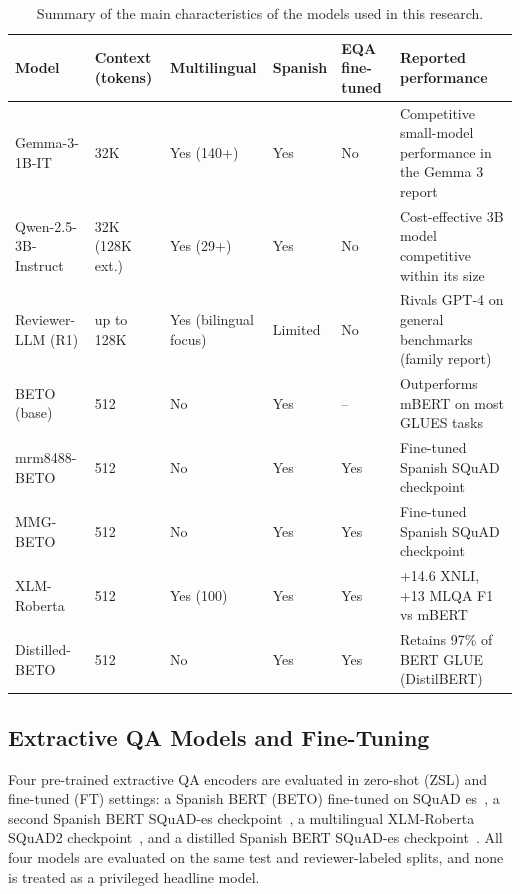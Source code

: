 \documentclass[graybox]{SNmult}
\begin{document}
\begin{table}[!t]
\caption{Summary of the main characteristics of the models used in this research.}
\label{tab:model-summary}
\centering
\small
\begin{tabular}{p{2.8cm}p{1.5cm}p{1.4cm}p{1.2cm}p{1.5cm}p{3.0cm}}
\toprule
Model & Context (tokens) & Multilingual & Spanish & EQA fine-tuned & Reported performance \\
\midrule
Gemma-3-1B-IT & 32K & Yes (140+) & Yes & No & Competitive small-model performance in the Gemma 3 report \\
Qwen-2.5-3B-Instruct & 32K (128K ext.) & Yes (29+) & Yes & No & Cost-effective 3B model competitive within its size \\
Reviewer-LLM (R1) & up to 128K & Yes (bilingual focus) & Limited & No & Rivals GPT-4 on general benchmarks (family report) \\
BETO (base) & 512 & No & Yes & -- & Outperforms mBERT on most GLUES tasks \\
mrm8488-BETO & 512 & No & Yes & Yes & Fine-tuned Spanish SQuAD checkpoint \\
MMG-BETO & 512 & No & Yes & Yes & Fine-tuned Spanish SQuAD checkpoint \\
XLM-Roberta & 512 & Yes (100) & Yes & Yes & +14.6 XNLI, +13 MLQA F1 vs mBERT \\
Distilled-BETO & 512 & No & Yes & Yes & Retains 97\% of BERT GLUE (DistilBERT) \\
\bottomrule
\end{tabular}
\end{table}


\subsection{Extractive QA Models and Fine-Tuning}

Four pre-trained extractive QA encoders are evaluated in zero-shot (ZSL) and
fine-tuned (FT) settings: a Spanish BERT (BETO) fine-tuned on SQuAD
es~\cite{mrm8488_beto_squad2_hf}, a second Spanish BERT SQuAD-es
checkpoint~\cite{mmg_beto_squad2_hf}, a multilingual XLM-Roberta SQuAD2
checkpoint~\cite{xlmr_squad2_hf}, and a distilled Spanish BERT SQuAD-es
checkpoint~\cite{distill_beto_squad2_hf}. All four models are evaluated on the
same test and reviewer-labeled splits, and none is treated as a privileged headline model.
\end{document}
